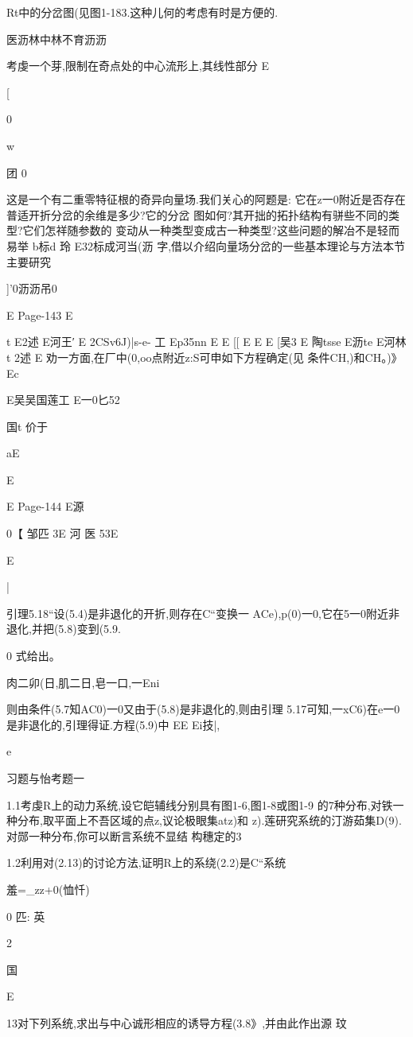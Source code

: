 {{{{{{{{{Rt中的分岔图(见图1-183.这种儿何的考虑有时是方便的.

医沥林中林不育沥沥

考虔一个芽,限制在奇点处的中心流形上,其线性部分
E

[

0

w

团
0

这是一个有二重零特征根的奇异向量场.我们关心的阿题是:
它在z一0附近是否存在普适开折分岔的余维是多少?它的分岔
图如何?其开拙的拓扑结构有骈些不同的类型?它们怎祥随参数的
变动从一种类型变成古一种类型?这些问题的解冶不是轻而易举
b标d
玲
E32标成河当(沥
字,借以介绍向量场分岔的一些基本理论与方法本节主要研究

]'0沥沥吊0

E
Page-143
E

t
E2述
E河王′
E
2CSv6J)|s-e-
工
Ep35nn
E
E
[[
E
E
E
[吴3
E
陶tsse
E沥te
E河林t
2述
E
劝一方面,在厂中(0,oo点附近z:S可申如下方程确定(见
条件CH,)和CH。)》
Ec

E吴吴国莲工
E一0匕52

国t
价于

aE

E

E
Page-144
E源

0【
邹匹
3E
河
医
53E

E

|

引理5.18“设(5.4)是非退化的开折,则存在C“变换一
ACe),p(0)一0,它在5一0附近非退化,并把(5.8)变到(5.9.

0
式给出。

肉二卯(日,肌二日,皂一口,一Eni

则由条件(5.7知AC0)一0又由于(5.8)是非退化的,则由引理
5.17可知,一xC6)在e一0是非退化的,引理得证.方程(5.9)中
EE
Ei技|,

e

习题与怡考题一

1.1考虔R上的动力系统,设它皑辅线分别具有图1-6,图1-8或图1-9
的7种分布,对铁一种分布,取平面上不吾区域的点z,议论极眼集atz)和
z).莲研究系统的汀游茹集D(9).对郧一种分布,你可以断言系统不显结
构穗定的3

1.2利用对(2.13)的讨论方法,证明R上的系绕(2.2)是C“系统

羞=_zz+0(恤忏)

0
匹:
英

2

国

E

13对下列系统,求出与中心诚形相应的诱导方程(3.8》,并由此作出源
玟

}}}}}}}}}
